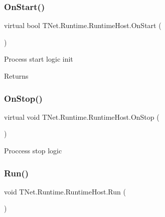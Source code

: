 \subsubsection{\texorpdfstring{On\+Start()}{OnStart()}}
{\footnotesize\ttfamily virtual bool T\+Net.\+Runtime.\+Runtime\+Host.\+On\+Start (\begin{DoxyParamCaption}{ }\end{DoxyParamCaption})\hspace{0.3cm}{\ttfamily [virtual]}}



Process start logic init 

\begin{DoxyReturn}{Returns}

\end{DoxyReturn}
\mbox{\label{class_t_net_1_1_runtime_1_1_runtime_host_ad1e016ede364bf6281d6c663960c3a65}} 
\subsubsection{\texorpdfstring{On\+Stop()}{OnStop()}}
{\footnotesize\ttfamily virtual void T\+Net.\+Runtime.\+Runtime\+Host.\+On\+Stop (\begin{DoxyParamCaption}{ }\end{DoxyParamCaption})\hspace{0.3cm}{\ttfamily [virtual]}}



Proccess stop logic 

\mbox{\label{class_t_net_1_1_runtime_1_1_runtime_host_a8499d71ffc98517e778e43801f68f54f}} 
\subsubsection{\texorpdfstring{Run()}{Run()}}
{\footnotesize\ttfamily void T\+Net.\+Runtime.\+Runtime\+Host.\+Run (\begin{DoxyParamCaption}{ }\end{DoxyParamCaption})}




